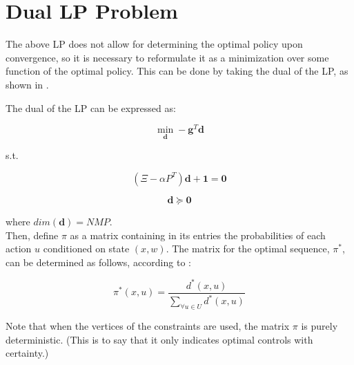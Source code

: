 \documentclass{article}
\begin{document}
	
	\section{Dual LP Problem}
	The above LP does not allow for determining the optimal policy upon convergence, so it is necessary to reformulate it as a minimization over some function of the optimal policy. This can be done by taking the dual of the LP, as shown in \cite{4220813}.
	
	The dual of the LP can be expressed as:
	
	\begin{equation}
	\min_{\boldsymbol{d}} -\boldsymbol{g}^{T} \boldsymbol{d}
	\end{equation}
	
	s.t.
	
	\begin{displaymath} 
	(\Xi-\alpha P^{T})\boldsymbol{d} + \boldsymbol{1} = \boldsymbol{0}
	\end{displaymath}
	
	\begin{displaymath} 
	\boldsymbol{d} \succeq \boldsymbol{0}
	\end{displaymath}
	
	where $dim(\boldsymbol{d})=NMP$.\\
	
	Then, define $\pi$ as a matrix containing in its entries the probabilities of each action $u$ conditioned on state $(x,w)$. The matrix for the optimal sequence, $\pi^{*}$, can be determined as follows, according to \cite{4220813}:
	
	\begin{equation}
	\pi^{*}(x,u)=\frac{d^{*}(x,u)}{\sum_{\forall u \in U}d^{*}(x,u)}
	\end{equation}
	
	Note that when the vertices of the constraints are used, the matrix $\pi$ is purely deterministic\cite{MDPs}. (This is to say that it only indicates optimal controls with certainty.)
	
	
\end{document}
